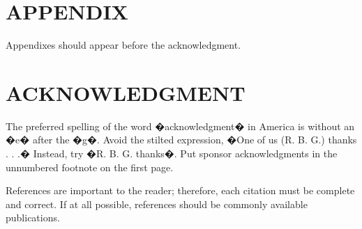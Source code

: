 \documentclass[letterpaper, 10 pt, conference]{ieeeconf}  %
\begin{document}
\section*{APPENDIX}

Appendixes should appear before the acknowledgment.

\section*{ACKNOWLEDGMENT}

The preferred spelling of the word �acknowledgment� in America is without an �e� after the �g�. Avoid the stilted expression, �One of us (R. B. G.) thanks . . .�  Instead, try �R. B. G. thanks�. Put sponsor acknowledgments in the unnumbered footnote on the first page.




References are important to the reader; therefore, each citation must be complete and correct. If at all possible, references should be commonly available publications.
\end{document}
